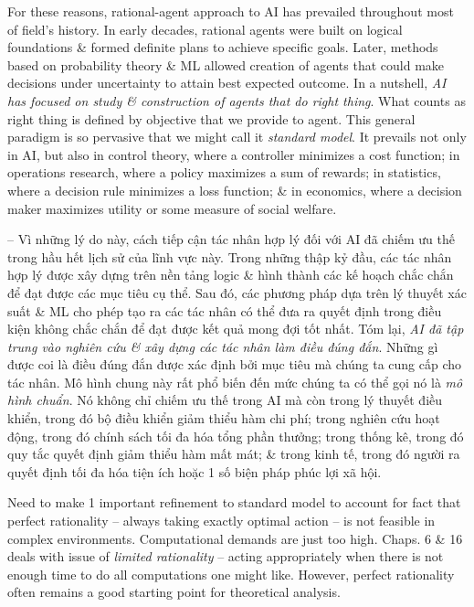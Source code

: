 \documentclass{article}
\begin{document}
\begin{itemize}
\begin{itemize}
\begin{itemize}
\begin{itemize}
				For these reasons, rational-agent approach to AI has prevailed throughout most of field's history. In early decades, rational agents were built on logical foundations \& formed definite plans to achieve specific goals. Later, methods based on probability theory \& ML allowed creation of agents that could make decisions under uncertainty to attain best expected outcome. In a nutshell, {\it AI has focused on study \& construction of agents that do right thing}. What counts as right thing is defined by objective that we provide to agent. This general paradigm is so pervasive that we might call it {\it standard model}. It prevails not only in AI, but also in control theory, where a controller minimizes a cost function; in operations research, where a policy maximizes a sum of rewards; in statistics, where a decision rule minimizes a loss function; \& in economics, where a decision maker maximizes utility or some measure of social welfare.

				-- Vì những lý do này, cách tiếp cận tác nhân hợp lý đối với AI đã chiếm ưu thế trong hầu hết lịch sử của lĩnh vực này. Trong những thập kỷ đầu, các tác nhân hợp lý được xây dựng trên nền tảng logic \& hình thành các kế hoạch chắc chắn để đạt được các mục tiêu cụ thể. Sau đó, các phương pháp dựa trên lý thuyết xác suất \& ML cho phép tạo ra các tác nhân có thể đưa ra quyết định trong điều kiện không chắc chắn để đạt được kết quả mong đợi tốt nhất. Tóm lại, {\it AI đã tập trung vào nghiên cứu \& xây dựng các tác nhân làm điều đúng đắn}. Những gì được coi là điều đúng đắn được xác định bởi mục tiêu mà chúng ta cung cấp cho tác nhân. Mô hình chung này rất phổ biến đến mức chúng ta có thể gọi nó là {\it mô hình chuẩn}. Nó không chỉ chiếm ưu thế trong AI mà còn trong lý thuyết điều khiển, trong đó bộ điều khiển giảm thiểu hàm chi phí; trong nghiên cứu hoạt động, trong đó chính sách tối đa hóa tổng phần thưởng; trong thống kê, trong đó quy tắc quyết định giảm thiểu hàm mất mát; \& trong kinh tế, trong đó người ra quyết định tối đa hóa tiện ích hoặc 1 số biện pháp phúc lợi xã hội.

				Need to make 1 important refinement to standard model to account for fact that perfect rationality -- always taking exactly optimal action -- is not feasible in complex environments. Computational demands are just too high. Chaps. 6 \& 16 deals with issue of {\it limited rationality} -- acting appropriately when there is not enough time to do all computations one might like. However, perfect rationality often remains a good starting point for theoretical analysis.


\end{itemize}
\end{itemize}
\end{itemize}
\end{itemize}
\end{document}
